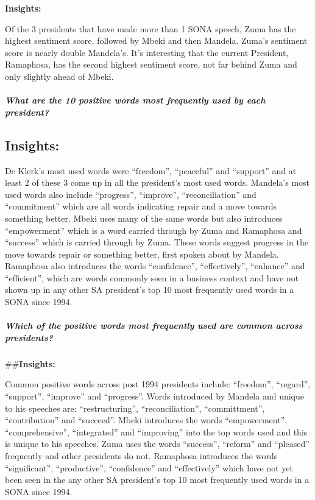 \documentclass[]{article}
\let\oldsubparagraph\subparagraph
\renewcommand{\subparagraph}[1]{\oldsubparagraph{#1}\mbox{}}
\begin{document}
\textbf{Insights:}

Of the 3 presidents that have made more than 1 SONA speech, Zuma has the
highest sentiment score, followed by Mbeki and then Mandela. Zuma's
sentiment score is nearly double Mandela's. It's interesting that the
current President, Ramaphosa, has the second highest sentiment score,
not far behind Zuma and only slightly ahead of Mbeki.

\hypertarget{what-are-the-10-positive-words-most-frequently-used-by-each-president}{%
\subparagraph{\texorpdfstring{\textbf{What are the 10 positive words
most frequently used by each
president?}}{What are the 10 positive words most frequently used by each president?}}\label{what-are-the-10-positive-words-most-frequently-used-by-each-president}}

\hypertarget{insights-6}{%
\subsection{\texorpdfstring{\textbf{Insights:}}{Insights:}}\label{insights-6}}

De Klerk's most used words were ``freedom'', ``peaceful'' and
``support'' and at least 2 of these 3 come up in all the president's
most used words. Mandela's most used words also include ``progress'',
``improve'', ``reconciliation'' and ``commitment'' which are all words
indicating repair and a move towards something better. Mbeki uses many
of the same words but also introduces ``empowerment'' which is a word
carried through by Zuma and Ramaphosa and ``success'' which is carried
through by Zuma. These words suggest progress in the move towards repair
or something better, first spoken about by Mandela. Ramaphosa also
introduces the words ``confidence'', ``effectively'', ``enhance'' and
``efficient'', which are words commonly seen in a business context and
have not shown up in any other SA president's top 10 most frequently
used words in a SONA since 1994.

\hypertarget{which-of-the-positive-words-most-frequently-used-are-common-across-presidents}{%
\subparagraph{\texorpdfstring{\textbf{Which of the positive words most
frequently used are common across
presidents?}}{Which of the positive words most frequently used are common across presidents?}}\label{which-of-the-positive-words-most-frequently-used-are-common-across-presidents}}

\#\#\textbf{Insights:}

Common positive words across post 1994 presidents include: ``freedom'',
``regard'', ``support'', ``improve'' and ``progress''. Words introduced
by Mandela and unique to his speeches are: ``restructuring'',
``reconciliation'', ``committment'', ``contribution'' and ``succeed''.
Mbeki introduces the words ``empowerment'', ``comprehensive'',
``integrated'' and ``improving'' into the top words used and this is
unique to his speeches. Zuma uses the words ``success'', ``reform'' and
``pleased'' frequently and other presidents do not. Ramaphosa introduces
the words ``significant'', ``productive'', ``confidence'' and
``effectively'' which have not yet been seen in the any other SA
president's top 10 most frequently used words in a SONA since 1994.
\end{document}
